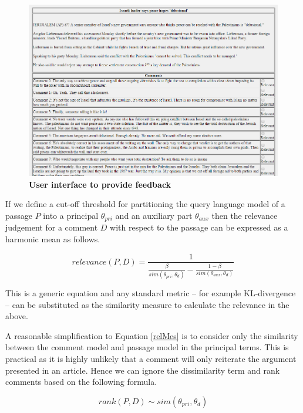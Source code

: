 \documentclass[article]{IEEEtran}
\begin{document}
\begin{figure}[!ht]
\centering
\captionsetup{justification=centering}
\includegraphics[trim=0cm 0cm 0cm 0cm, clip=true, totalheight=0.5\textheight, angle=0]{feedback-1.png}
\caption{\textbf{User interface to provide feedback}} \label{feedback}
\end{figure}


If we define a cut-off threshold for partitioning the query language model of a passage $P$ into a principal $\theta_{pri}$ and an auxiliary part $\theta_{aux}$ then the relevance judgement for a comment $D$ with respect to the passage can be expressed as a harmonic mean as follows.

\begin{equation}
\label{relMes}
relevance(P,D) = \frac{1}{\frac{\beta}{sim(\theta_{pri}, \theta_d)} - \frac{1 - \beta}{sim(\theta_{aux}, \theta_d)}}
\end{equation}           



This is a generic equation and any standard metric -- for example KL-divergence -- can be substituted as the similarity measure to calculate the relevance in the above.

A reasonable simplification to Equation \ref{relMes} is to consider only the similarity between the comment model and passage model in the principal terms. This is practical as it is highly unlikely that a comment will only reiterate the argument presented in an article. Hence we can ignore the dissimilarity term and rank comments based on the following formula.

\begin{equation}
\label{rank}
rank(P,D) \sim sim(\theta_{pri}, \theta_d)
\end{equation} 
\end{document}
